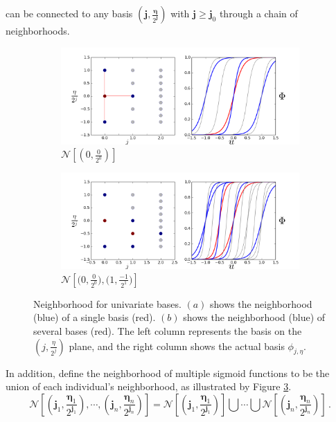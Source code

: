 can be connected to any basis $(\boldsymbol{j}, \frac{\boldsymbol{\eta}}{2^{\boldsymbol{j}}})$ 
with $\boldsymbol{j} \ge \boldsymbol{j}_0$ through a chain
of neighborhoods.
\begin{figure}[Htbp]\begin{center}
    \begin{subfigure}[p]{1.\textwidth}
        \centering
        \includegraphics[width=10cm]{../basis_neighbor.png}
        \caption{$\mathcal{N}\left[\left(0,\frac{0}{2^0}\right)\right]$}
        \label{fig: basis neighbor}
    \end{subfigure}
    \begin{subfigure}[p]{1.\textwidth}
        \centering
        \includegraphics[width=10cm]{../basis_neighbor_2.png}
        \caption{$\mathcal{N}\left[ \big(0, \frac{0}{2^0}\big), \big(1, \frac{-1}{2^1}\big)
                 \right]$}
        \label{fig: union neighbor}
    \end{subfigure}
    \caption{Neighborhood for univariate bases. 
             $(a)$ shows the neighborhood (blue)
             of a single basis (red).  $(b)$ shows the neighborhood (blue) 
             of several bases (red). 
             The left column represents the basis on the $\left(j, \frac{\eta}{2^j}\right)$ plane,
             and the right column shows the actual basis $\phi_{j,\eta}$.}
\end{center}\end{figure}
In addition, define the neighborhood of multiple sigmoid functions to be the union
of each individual's neighborhood, as illustrated by Figure \ref{fig: union neighbor}.
\begin{equation}
    \mathcal{N}\left[(\boldsymbol{j}_1, \frac{\boldsymbol{\eta}_1}{2^{\boldsymbol{j}_1}} ), \cdots, 
    ( \boldsymbol{j}_n, \frac{\boldsymbol{\eta}_n}{2^{\boldsymbol{j}_n}}) \right]
    = \mathcal{N}\left[(\boldsymbol{j}_1, \frac{\boldsymbol{\eta}_1}{2^{\boldsymbol{j}_1}})\right]\bigcup \cdots 
      \bigcup \mathcal{N}\left[(\boldsymbol{j}_n, \frac{\boldsymbol{\eta}_n}{2^{\boldsymbol{j}_n}})\right]\,.
\end{equation}\\

